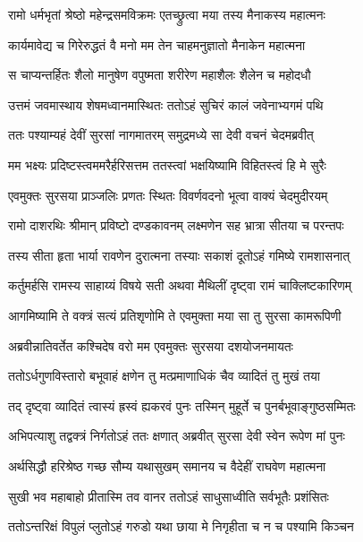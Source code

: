 \twolineshloka
{रामो धर्मभृतां श्रेष्ठो महेन्द्रसमविक्रमः}
{एतच्छ्रुत्वा मया तस्य मैनाकस्य महात्मनः} %

\twolineshloka
{कार्यमावेद्य च गिरेरुद्धतं वै मनो मम}
{तेन चाहमनुज्ञातो मैनाकेन महात्मना} %

\twolineshloka
{स चाप्यन्तर्हितः शैलो मानुषेण वपुष्मता}
{शरीरेण महाशैलः शैलेन च महोदधौ} %

\twolineshloka
{उत्तमं जवमास्थाय शेषमध्वानमास्थितः}
{ततोऽहं सुचिरं कालं जवेनाभ्यगमं पथि} %

\twolineshloka
{ततः पश्याम्यहं देवीं सुरसां नागमातरम्}
{समुद्रमध्ये सा देवी वचनं चेदमब्रवीत्} %

\twolineshloka
{मम भक्ष्यः प्रदिष्टस्त्वममरैर्हरिसत्तम}
{ततस्त्वां भक्षयिष्यामि विहितस्त्वं हि मे सुरैः} %

\twolineshloka
{एवमुक्तः सुरसया प्राञ्जलिः प्रणतः स्थितः}
{विवर्णवदनो भूत्वा वाक्यं चेदमुदीरयम्} %

\twolineshloka
{रामो दाशरथिः श्रीमान् प्रविष्टो दण्डकावनम्}
{लक्ष्मणेन सह भ्रात्रा सीतया च परन्तपः} %

\twolineshloka
{तस्य सीता हृता भार्या रावणेन दुरात्मना}
{तस्याः सकाशं दूतोऽहं गमिष्ये रामशासनात्} %

\twolineshloka
{कर्तुमर्हसि रामस्य साहाय्यं विषये सती}
{अथवा मैथिलीं दृष्ट्वा रामं चाक्लिष्टकारिणम्} %

\twolineshloka
{आगमिष्यामि ते वक्त्रं सत्यं प्रतिशृणोमि ते}
{एवमुक्ता मया सा तु सुरसा कामरूपिणी} %

\twolineshloka
{अब्रवीन्नातिवर्तेत कश्चिदेष वरो मम}
{एवमुक्तः सुरसया दशयोजनमायतः} %

\twolineshloka
{ततोऽर्धगुणविस्तारो बभूवाहं क्षणेन तु}
{मत्प्रमाणाधिकं चैव व्यादितं तु मुखं तया} %

\twolineshloka
{तद् दृष्ट्वा व्यादितं त्वास्यं ह्रस्वं ह्यकरवं पुनः}
{तस्मिन् मुहूर्ते च पुनर्बभूवाङ्गुष्ठसम्मितः} %

\twolineshloka
{अभिपत्याशु तद्वक्त्रं निर्गतोऽहं ततः क्षणात्}
{अब्रवीत् सुरसा देवी स्वेन रूपेण मां पुनः} %

\twolineshloka
{अर्थसिद्धौ हरिश्रेष्ठ गच्छ सौम्य यथासुखम्}
{समानय च वैदेहीं राघवेण महात्मना} %

\twolineshloka
{सुखी भव महाबाहो प्रीतास्मि तव वानर}
{ततोऽहं साधुसाध्वीति सर्वभूतैः प्रशंसितः} %

\twolineshloka
{ततोऽन्तरिक्षं विपुलं प्लुतोऽहं गरुडो यथा}
{छाया मे निगृहीता च न च पश्यामि किञ्चन} %

